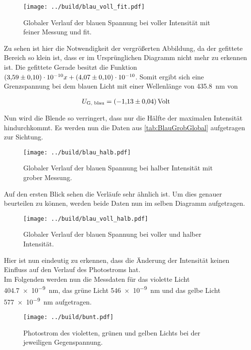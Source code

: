 \begin{figure}[H]
    \centering
    \texttt{[image: ../build/blau\_voll\_fit.pdf]}
    \caption{Globaler Verlauf der blauen Spannung bei voller Intensität mit feiner Messung und fit.}
\end{figure}

\noindent Zu sehen ist hier die Notwendigkeit der vergrößerten Abbildung, da der gefittete Bereich so klein ist, dass er im 
Ursprünglichen Diagramm nicht mehr zu erkennen ist. Die gefittete Gerade besitzt die Funktion $\num{3.59\pm0.1 e-10} x + \num{4.07\pm0.1e-10}$. 
Somit ergibt sich eine Grenzspannung bei dem blauen Licht mit einer Wellenlänge von \qty{435.8}{\nano\meter} von 

\begin{align}
    U_{\text{G, blau}} = \qty{-1.13\pm0.04}{Volt}
\end{align}

\noindent Nun wird die Blende so verringert, dass nur die Hälfte der maximalen Intensität hindurchkommt. Es werden nun die Daten 
aus \ref{tab:BlauGrobGlobal} aufgetragen zur Sichtung.

\begin{figure}[H]
    \centering
    \texttt{[image: ../build/blau\_halb.pdf]}
    \caption{Globaler Verlauf der blauen Spannung bei halber Intensität mit grober Messung.}
\end{figure}

\noindent Auf den ersten Blick sehen die Verläufe sehr ähnlich ist. Um dies genauer beurteilen zu können, werden beide Daten nun 
im selben Diagramm aufgetragen.

\begin{figure}[H]
    \centering
    \texttt{[image: ../build/blau\_voll\_halb.pdf]}
    \caption{Globaler Verlauf der blauen Spannung bei voller und halber Intensität.}
\end{figure}

\noindent Hier ist nun eindeutig zu erkennen, dass die Änderung der Intensität keinen Einfluss auf den Verlauf des Photostroms hat.\\
\noindent Im Folgenden werden nun die Messdaten für das violette Licht \qty{404.7e-9}{\nano\meter}, das grüne Licht \qty{546e-9}{\nano\meter} 
und das gelbe Licht \qty{577e-9}{\nano\meter} aufgetragen. 


\begin{figure}[H]
    \centering
    \texttt{[image: ../build/bunt.pdf]}
    \caption{Photostrom des violetten, grünen und gelben Lichts bei der jeweiligen Gegenspannung.}
\end{figure}

